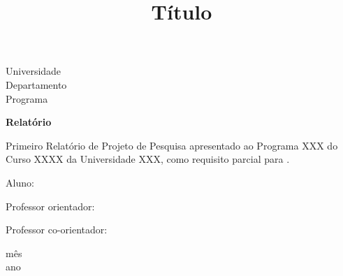 \documentclass[a4paper, 12pt]{article}
\begin{document}
\begin{titlepage}
	\begin{center}
	

		\Huge{Universidade}\\
		\large{Departamento}\\ 
		\large{Programa}\\ 
\vspace{15pt}
        
        \vspace{85pt}
        
		\textbf{\LARGE{Relatório}}
		\title{\large{Título}}
			
	\end{center}
\vspace{1,5cm}
	
	\begin{flushright}

   \begin{list}{}{
      \setlength{\leftmargin}{4.5cm}
      \setlength{\rightmargin}{0cm}
      \setlength{\labelwidth}{0pt}
      \setlength{\labelsep}{\leftmargin}}

      \item Primeiro Relatório de Projeto de Pesquisa apresentado ao Programa XXX do Curso XXXX da Universidade XXX, como requisito parcial para .

      \begin{list}{}{
      \setlength{\leftmargin}{0cm}
      \setlength{\rightmargin}{0cm}
      \setlength{\labelwidth}{0pt}
      \setlength{\labelsep}{\leftmargin}}

			\item Aluno: \
            \item Professor orientador: \
      		\item Professor co-orientador: \

      \end{list}
   \end{list}
\end{flushright}
\vspace{1cm}
\begin{center}
		\vspace{\fill}
		 mês\\
		 ano
			\end{center}
\end{titlepage}
\newpage
\newpage
\tableofcontents
\thispagestyle{empty}
\end{document}
